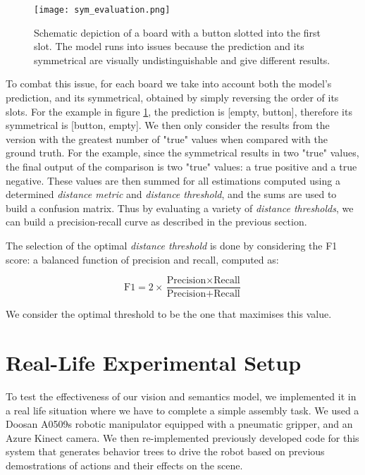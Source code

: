 \begin{figure}[ht]
    \texttt{[image: sym\_evaluation.png]}
    \caption{Schematic depiction of a board with a button slotted into the first slot. The model runs into issues because the prediction and its symmetrical are visually undistinguishable and give different results.}
    \label{sym_eval}
\end{figure}

To combat this issue, for each board we take into account both the model's prediction, and its symmetrical, obtained by simply reversing the order of its slots. For the example in figure \ref{sym_eval}, the prediction is [empty, button], therefore its symmetrical is [button, empty]. We then only consider the results from the version with the greatest number of "true" values when compared with the ground truth. For the example, since the symmetrical results in two "true" values, the final output of the comparison is two "true" values: a true positive and a true negative. These values are then summed for all estimations computed using a determined \emph{distance metric} and \emph{distance threshold}, and the sums are used to build a confusion matrix. Thus by evaluating a variety of \emph{distance thresholds}, we can build a precision-recall curve as described in the previous section.

The selection of the optimal \emph{distance threshold} is done by considering the F1 score: a balanced function of precision and recall, computed as:

\begin{equation*}
    \text{F1} = 2\times\frac{\text{Precision}\times\text{Recall}}{\text{Precision}+\text{Recall}}
\end{equation*}

We consider the optimal threshold to be the one that maximises this value.

\section{Real-Life Experimental Setup}

To test the effectiveness of our vision and semantics model, we implemented it in a real life situation where we have to complete a simple assembly task. We used a Doosan A0509s robotic manipulator equipped with a pneumatic gripper, and an Azure Kinect camera. We then re-implemented previously developed code for this system that generates behavior trees \cite{behavior_tree} to drive the robot based on previous demostrations of actions and their effects on the scene.

